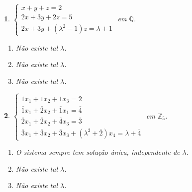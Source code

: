 \documentclass[12pt]{exam}
\newtheorem{exercicio}{}
\newcommand{\integer}{\mathbb{Z}}
\newcommand{\rac}{\mathbb{Q}}
\begin{document}
\begin{exercicio}
$\begin{cases}
  x + y + z = 2\\
  2x + 3y + 2z = 5\\
  2x + 3y + (\lambda^2 - 1)z = \lambda + 1
\end{cases}$ em $\rac$.
\begin{solucao}
  \begin{enumerate}[label={\alph*})]
    \item N\~ao existe tal $\lambda$.
    \item N\~ao existe tal $\lambda$.
    \item N\~ao existe tal $\lambda$.
  \end{enumerate}
\end{solucao}
\end{exercicio}

\begin{exercicio}
$\begin{cases}
  \overline{1}x_1 + \overline{1}x_2 + \overline{1}x_3= \overline{2}\\
  \overline{1}x_1 + \overline{2}x_2 + \overline{1}x_1 = \overline{4}\\
  \overline{2}x_1 + \overline{2}x_2 + \overline{4}x_3 = \overline{3}\\
  \overline{3}x_1 + \overline{3}x_2 + \overline{3}x_3 + (\lambda^2 + \overline{2})x_4 = \lambda + \overline{4}
\end{cases}$ em $\integer_5$.
\begin{solucao}
  \begin{enumerate}[label={\alph*})]
    \item O sistema sempre tem solu\c{c}\~ao \'unica, independente de $\lambda$.
    \item N\~ao existe tal $\lambda$.
    \item N\~ao existe tal $\lambda$.
  \end{enumerate}
\end{solucao}
\end{exercicio}
\end{document}
